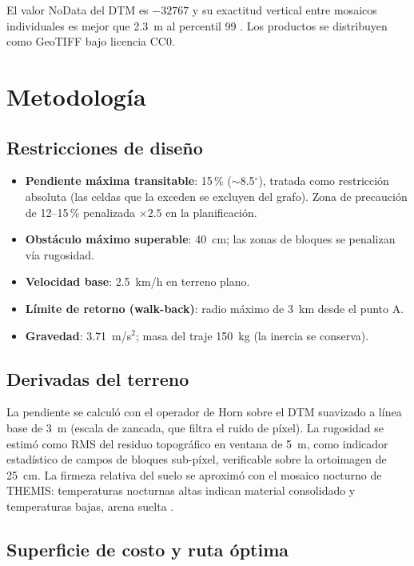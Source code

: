 \documentclass{article}
\begin{document}
El valor NoData del DTM es $-32767$ y su exactitud vertical entre mosaicos individuales es mejor que 2.3~m al percentil 99 \citep{usgs2024}. Los productos se distribuyen como GeoTIFF bajo licencia CC0.

\newpage

\section{Metodología}

\subsection{Restricciones de diseño}

\begin{itemize}
    \item \textbf{Pendiente máxima transitable}: 15\,\% ($\sim$8.5$^{\circ}$), tratada como restricción absoluta (las celdas que la exceden se excluyen del grafo). Zona de precaución de 12--15\,\% penalizada $\times 2.5$ en la planificación.
    \item \textbf{Obstáculo máximo superable}: 40~cm; las zonas de bloques se penalizan vía rugosidad.
    \item \textbf{Velocidad base}: 2.5~km/h en terreno plano.
    \item \textbf{Límite de retorno (walk-back)}: radio máximo de 3~km desde el punto A.
    \item \textbf{Gravedad}: 3.71~m/s$^2$; masa del traje 150~kg (la inercia se conserva).
\end{itemize}

\subsection{Derivadas del terreno}

La pendiente se calculó con el operador de Horn sobre el DTM suavizado a línea base de 3~m (escala de zancada, que filtra el ruido de píxel). La rugosidad se estimó como RMS del residuo topográfico en ventana de 5~m, como indicador estadístico de campos de bloques sub-píxel, verificable sobre la ortoimagen de 25~cm. La firmeza relativa del suelo se aproximó con el mosaico nocturno de THEMIS: temperaturas nocturnas altas indican material consolidado y temperaturas bajas, arena suelta \citep{usgs2018}.

\subsection{Superficie de costo y ruta óptima}
\end{document}
